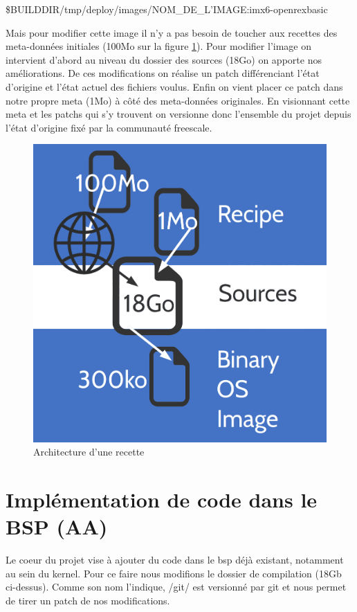 \$BUILDDIR/tmp/deploy/images/{NOM\_DE\_L’IMAGE:imx6-openrexbasic} \medskip

Mais pour modifier cette image il n’y a pas besoin de toucher aux recettes des
meta-données initiales (100Mo sur la figure \ref{fig:recette}). Pour modifier l’image on intervient
d'abord au niveau du dossier des sources (18Go) on apporte nos améliorations. De ces
modifications on réalise un patch différenciant l’état d’origine et l’état actuel des fichiers
voulus. Enfin on vient placer ce patch dans notre propre meta (1Mo) à côté des
meta-données originales. En visionnant cette meta et les patchs qui s’y trouvent on
versionne donc l’ensemble du projet depuis l’état d’origine fixé par la communauté
freescale.

\begin{figure}[!htb]
    \centering
    \includegraphics[trim={0cm 0cm 0cm 0cm},clip,scale=0.1]{Figures/recette.png}
    \decoRule
    \caption{Architecture d'une recette} \label{fig:recette}
\end{figure} 

\section{Implémentation de code dans le BSP (AA)}

Le coeur du projet vise à ajouter du code dans le bsp déjà existant, notamment au sein du
kernel. Pour ce faire nous modifions le dossier de compilation (18Gb ci-dessus). Comme
son nom l’indique, /git/ est versionné par git et nous permet de tirer un patch de nos
modifications. \medskip

